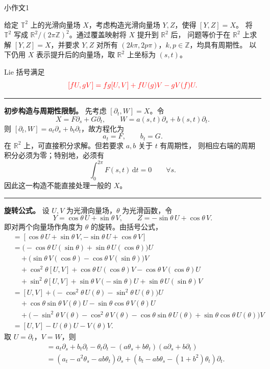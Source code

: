 \documentclass[11pt,a4paper]{ctexart}
\newcommand{\R}{\mathbb R}
\newcommand{\T}{\mathbb T}
\newcommand{\dd}{\,\mathrm d}
\newcommand{\sep}{\par\vspace{5pt}\noindent\rule{\linewidth}{0.7pt}\par\vspace{5pt}}
\newcommand{\red}[1]{{\color{red}#1}}
\begin{document}
\begin{center}\Large 小作文1\end{center}
给定 $\T^2$ 上的光滑向量场 $X$，考虑构造光滑向量场 $Y,Z$，使得 $[Y,Z]=X$。
将 $\T^2$ 写成 $\R^2/(2\pi\mathbb Z)^2$。通过覆盖映射将 $X$ 提升到 $\R^2$ 后，
问题等价于在 $\R^2$ 上求解 $[Y,Z]=X$，并要求 $Y,Z$ 对所有
$(2k\pi,2p\pi)$，$k,p\in\mathbb Z$，均具有周期性。
以下仍用 $X$ 表示提升后的向量场，取 $\R^2$ 上坐标为 $(s,t)$。

Lie 括号满足
\[\red{[fU,gV]=fg[U,V]+fU(g)V-gV(f)U.}\]
\sep
\textbf{初步构造与周期性限制。}
先考虑 $[\partial_t,W]=X$。令
\[X=F\partial_s+G\partial_t,\qquad W=a(s,t)\partial_s+b(s,t)\partial_t.\]
则 $[\partial_t,W]=a_t\partial_s+b_t\partial_t$，故方程化为
\[a_t=F,\qquad b_t=G.\]
在 $\R^2$ 上，可直接积分求解。但若要求 $a,b$ 关于 $t$ 有周期性，
则相应右端的周期积分必须为零；特别地，必须有
\[\int_0^{2\pi}F(s,t)\dd t=0\qquad\forall s.\]
因此这一构造不能直接处理一般的 $X$。
\sep
\textbf{旋转公式。} 设 $U,V$ 为光滑向量场，$\theta$ 为光滑函数，令
\[Y=\cos\theta\,U+\sin\theta\,V,\qquad Z=-\sin\theta\,U+\cos\theta\,V.\]
即对两个向量场作角度为 $\theta$ 的旋转。由括号公式，
\begin{align*}
[Y,Z]&=[\cos\theta\,U+\sin\theta\,V,-\sin\theta\,U+\cos\theta\,V]\\
&=\bigl(-\cos\theta\,U(\sin\theta)+\sin\theta\,U(\cos\theta)\bigr)U\\
&\quad+\bigl(\sin\theta\,V(\cos\theta)-\cos\theta\,V(\sin\theta)\bigr)V\\
&\quad+\cos^2\theta[U,V]+\cos\theta\,U(\cos\theta)V-\cos\theta\,V(\cos\theta)U\\
&\quad+\sin^2\theta[U,V]+\sin\theta\,V(-\sin\theta)U+\sin\theta\,U(\sin\theta)V\\
&=[U,V]+\bigl(-\cos^2\theta\,U(\theta)-\sin^2\theta\,U(\theta)\bigr)U\\
&\quad+\cos\theta\sin\theta\,V(\theta)U-\sin\theta\cos\theta\,V(\theta)U\\
&\quad+\bigl(-\sin^2\theta\,V(\theta)-\cos^2\theta\,V(\theta)
             -\cos\theta\sin\theta\,U(\theta)+\sin\theta\cos\theta\,U(\theta)\bigr)V\\
&=[U,V]-U(\theta)U-V(\theta)V.
\end{align*}
取 $U=\partial_t$，$V=W$，则
\begin{align*}
[Y,Z]&=a_t\partial_s+b_t\partial_t-\theta_t\partial_t
 -(a\theta_s+b\theta_t)(a\partial_s+b\partial_t)\\
&=(a_t-a^2\theta_s-ab\theta_t)\partial_s
 +(b_t-ab\theta_s-(1+b^2)\theta_t)\partial_t.
\end{align*}
\end{document}

